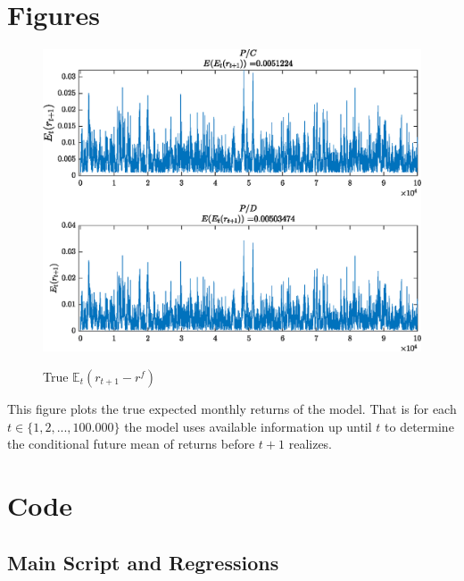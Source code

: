 \section{Figures}

\begin{figure}[H]
    \centering
    \caption{True $\mathbb{E}_t\left(r_{t+1}-r^f\right)$}
    \includegraphics{Figures/Excess_Rets.eps}
    \label{fig:ExpExRets}
\end{figure}
This figure plots the true expected monthly returns of the model. That is for each $t\in\{1,2,...,100.000\}$ the model uses available information up until $t$ to determine the conditional future mean of returns before $t+1$ realizes. 

\section{Code}
\subsection{Main Script and Regressions}
\label{sec:app1}




